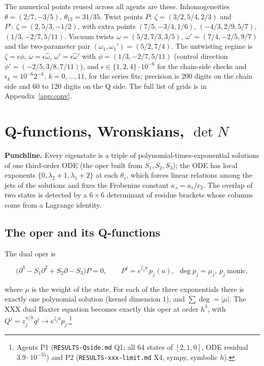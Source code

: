 \documentclass[11pt]{article}
\begin{document}
The numerical points reused across all agents are these.
Inhomogeneities $\theta=(2/7,-3/5)$, $\theta_{12}=31/35$. Twist points $P:\ \zeta=(3/2,5/4,2/3)$ and $P':\ \zeta=(2,5/3,-1/2)$, with extra points $(7/5,-3/4,1/6)$, $(-4/3,2/9,5/7)$, $(1/3,-2/7,5/11)$. Vacuum twists $\omega=(5/2,7/3,3/5)$, $\omega'=(7/4,-2/5,9/7)$ and the two-parameter pair $(\omega_1,\omega_1')=(5/2,7/4)$. The untwisting regime is $\zeta=\epsilon\phi$, $\omega=\epsilon\hat\omega$, $\omega'=\epsilon\hat\omega'$ with $\phi=(1/3,-2/7,5/11)$ (control direction $\phi'=(-2/5,3/8,7/11)$), and $\epsilon\in\{1,2,4\}\cdot10^{-6}$ for the chain-side checks and $\epsilon_k=10^{-6}2^{-k}$, $k=0,\dots,11$, for the series fits; precision is 200 digits on the chain side and 60 to 120 digits on the Q side.
The full list of grids is in Appendix~\ref{app:conv}.

\section{Q-functions, Wronskians, \texorpdfstring{$\det N$}{detN}}\label{sec:q}

\textbf{Punchline.} Every eigenstate is a triple of polynomial-times-exponential solutions of one third-order ODE (the oper built from $S_1,S_2,S_3$); the ODE has local exponents $\{0,\lambda_2+1,\lambda_1+2\}$ at each $\theta_s$, which forces linear relations among the jets of the solutions and fixes the Frobenius constant $\kappa_s=a_s/c_2$. The overlap of two states is detected by a $6\times6$ determinant of residue brackets whose columns come from a Lagrange identity.

\subsection{The oper and its Q-functions}\label{sec:oper}

The dual oper is

\begin{equation}
\bigl(\partial^3-S_1\partial^2+S_2\partial-S_3\bigr)P=0,\qquad P^j=e^{\zeta_ju}\,p_j(u),\ \ \deg p_j=\mu_j,\ p_j\ \text{monic},\label{eq:oper}
\end{equation}

where $\mu$ is the weight of the state.
For each of the three exponentials there is exactly one polynomial solution (kernel dimension 1), and $\sum\deg=|\mu|$. The XXX dual Baxter equation becomes exactly this oper at order $h^3$, with $Q^j=z_j^{u/h}q^j\to e^{\zeta_ju}p_j$.\footnote{Agents P1 (\texttt{RESULTS-\allowbreak{}Qside.\allowbreak{}md} Q1; all 64 states of $[2,1,0]$, ODE residual $3.9\cdot10^{-55}$) and P2 (\texttt{RESULTS-\allowbreak{}xxx-\allowbreak{}limit.\allowbreak{}md} X4, sympy, symbolic $h$).}
\end{document}
